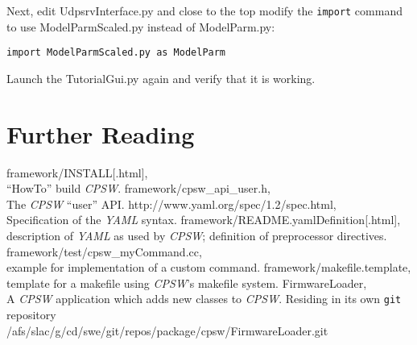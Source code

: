 \documentclass[10pt]{article}
\newcommand{\ita}[1]{\emph{#1}}
\newcommand{\cpsw}      {\ita {CPSW}}
\newcommand{\yaml}      {\ita {YAML}}
\newcommand{\cod}[1] {{\tt#1}}
\begin{document}
Next, edit UdpsrvInterface.py and close to the top modify the \cod{import} 
command to use ModelParmScaled.py instead of ModelParm.py:
\begin{verbatim}
import ModelParmScaled.py as ModelParm
\end{verbatim}
Launch the TutorialGui.py again and verify that it is working.

\section{Further Reading}

\begin{thebibliography}{9}
framework/INSTALL[.html],\\
``HowTo'' build \cpsw{}.
framework/cpsw\_api\_user.h,\\
The \cpsw{} ``user'' API.
http://www.yaml.org/spec/1.2/spec.html,\\
Specification of the \yaml{} syntax.
framework/README.yamlDefinition[.html],\\
description of \yaml{} as used by \cpsw{}; definition of preprocessor directives.
framework/test/cpsw\_myCommand.cc,\\
example for implementation of a custom command.
framework/makefile.template,\\
template for a makefile using \cpsw{}'s makefile system.
FirmwareLoader,\\
A \cpsw{} application which adds new classes to \cpsw{}. Residing in its own
\cod{git} repository\\
/afs/slac/g/cd/swe/git/repos/package/cpsw/FirmwareLoader.git
\end{thebibliography}
\end{document}
